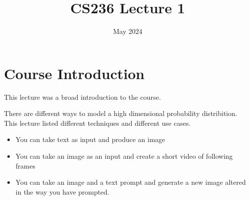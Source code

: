 \documentclass{article}
\title{CS236 Lecture 1}
\date{May 2024}
\begin{document}
\maketitle
\section{Course Introduction}
This lecture was a broad introduction to the course.

There are different ways to model a high dimensional probability distribition.
This lecture listed different techniques and different use cases.

\begin{itemize}
    \item You can take text as input and produce an image
    \item You can take an image as an input and create a short video of following frames
    \item You can take an image and a text prompt and generate a new image altered in the way you have prompted.
  \end{itemize}
\end{document}
